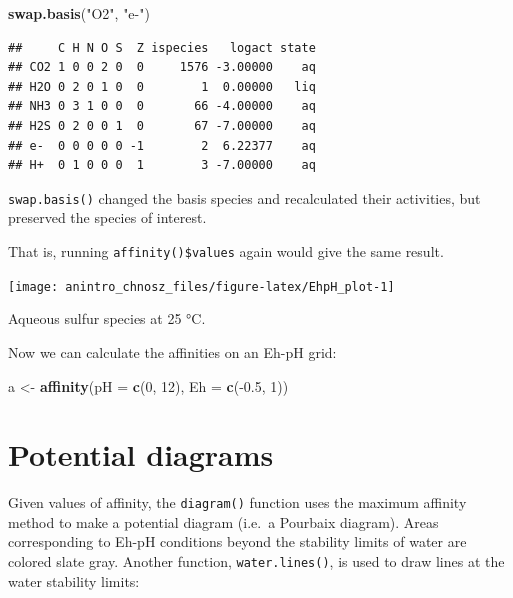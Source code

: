 \documentclass[]{tufte-book}
\newenvironment{Shaded}{}{}
\newcommand{\KeywordTok}[1]{\textcolor[rgb]{0.00,0.44,0.13}{\textbf{#1}}}
\newcommand{\DataTypeTok}[1]{\textcolor[rgb]{0.56,0.13,0.00}{#1}}
\newcommand{\DecValTok}[1]{\textcolor[rgb]{0.25,0.63,0.44}{#1}}
\newcommand{\FloatTok}[1]{\textcolor[rgb]{0.25,0.63,0.44}{#1}}
\newcommand{\StringTok}[1]{\textcolor[rgb]{0.25,0.44,0.63}{#1}}
\newcommand{\OperatorTok}[1]{\textcolor[rgb]{0.40,0.40,0.40}{#1}}
\newcommand{\NormalTok}[1]{#1}
\begin{document}
\begin{Shaded}
\begin{Highlighting}[]
\KeywordTok{swap.basis}\NormalTok{(}\StringTok{"O2"}\NormalTok{, }\StringTok{"e-"}\NormalTok{)}
\end{Highlighting}
\end{Shaded}

\begin{verbatim}
##     C H N O S  Z ispecies   logact state
## CO2 1 0 0 2 0  0     1576 -3.00000    aq
## H2O 0 2 0 1 0  0        1  0.00000   liq
## NH3 0 3 1 0 0  0       66 -4.00000    aq
## H2S 0 2 0 0 1  0       67 -7.00000    aq
## e-  0 0 0 0 0 -1        2  6.22377    aq
## H+  0 1 0 0 0  1        3 -7.00000    aq
\end{verbatim}

{\texttt{swap.basis()}} changed the basis species and recalculated their
activities, but preserved the species of interest.

\begin{marginfigure}
That is, running {\texttt{affinity()}}\texttt{\$values} again would give
the same result.
\end{marginfigure}

\begin{marginfigure}
\texttt{[image: anintro\_chnosz\_files/figure-latex/EhpH\_plot-1]} \caption[Aqueous sulfur species at 25 °C]{Aqueous sulfur species at 25 °C.}\label{fig:EhpH_plot}
\end{marginfigure}

Now we can calculate the affinities on an Eh-pH grid:

\begin{Shaded}
\begin{Highlighting}[]
\NormalTok{a <-}\StringTok{ }\KeywordTok{affinity}\NormalTok{(}\DataTypeTok{pH =} \KeywordTok{c}\NormalTok{(}\DecValTok{0}\NormalTok{, }\DecValTok{12}\NormalTok{), }\DataTypeTok{Eh =} \KeywordTok{c}\NormalTok{(}\OperatorTok{-}\FloatTok{0.5}\NormalTok{, }\DecValTok{1}\NormalTok{))}
\end{Highlighting}
\end{Shaded}

\section{Potential diagrams}\label{potential-diagrams}

Given values of affinity, the {\texttt{diagram()}} function uses the
maximum affinity method to make a potential diagram (i.e.~a Pourbaix
diagram). Areas corresponding to Eh-pH conditions beyond the stability
limits of water are colored slate gray. Another function,
{\texttt{water.lines()}}, is used to draw lines at the water stability
limits:
\end{document}
